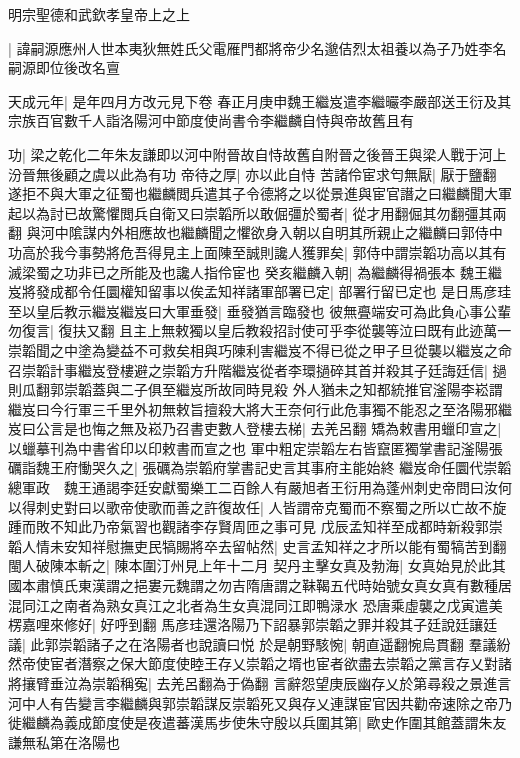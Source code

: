 明宗聖德和武欽孝皇帝上之上

|{
	諱嗣源應州人世本夷狄無姓氏父電雁門都將帝少名邈佶烈太祖養以為子乃姓李名嗣源即位後改名亶}


天成元年|{
	是年四月方改元見下卷}
春正月庚申魏王繼岌遣李繼曮李嚴部送王衍及其宗族百官數千人詣洛陽河中節度使尚書令李繼麟自恃與帝故舊且有

功|{
	梁之乾化二年朱友謙即以河中附晉故自恃故舊自附晉之後晉王與梁人戰于河上汾晉無後顧之虞以此為有功}
帝待之厚|{
	亦以此自恃}
苦諸伶宦求匄無厭|{
	厭于鹽翻}
遂拒不與大軍之征蜀也繼麟閲兵遣其子令德將之以從景進與宦官譖之曰繼麟聞大軍起以為討已故驚懼閲兵自衛又曰崇韜所以敢倔彊於蜀者|{
	從才用翻倔其勿翻彊其兩翻}
與河中隂謀内外相應故也繼麟聞之懼欲身入朝以自明其所親止之繼麟曰郭侍中功高於我今事勢將危吾得見主上面陳至誠則讒人獲罪矣|{
	郭侍中謂崇韜功高以其有滅梁蜀之功非已之所能及也讒人指伶宦也}
癸亥繼麟入朝|{
	為繼麟得禍張本}
魏王繼岌將發成都令任圜權知留事以俟孟知祥諸軍部署已定|{
	部署行留已定也}
是日馬彦珪至以皇后教示繼岌繼岌曰大軍垂發|{
	垂發猶言臨發也}
彼無亹端安可為此負心事公輩勿復言|{
	復扶又翻}
且主上無敕獨以皇后教殺招討使可乎李從襲等泣曰既有此迹萬一崇韜聞之中塗為變益不可救矣相與巧陳利害繼岌不得已從之甲子旦從襲以繼岌之命召崇韜計事繼岌登樓避之崇韜方升階繼岌從者李環撾碎其首并殺其子廷誨廷信|{
	撾則瓜翻郭崇韜蓋與二子俱至繼岌所故同時見殺}
外人猶未之知都統推官滏陽李崧謂繼岌曰今行軍三千里外初無敕旨擅殺大將大王奈何行此危事獨不能忍之至洛陽邪繼岌曰公言是也悔之無及崧乃召書吏數人登樓去梯|{
	去羌呂翻}
矯為敕書用蠟印宣之|{
	以蠟摹刊為中書省印以印敕書而宣之也}
軍中粗定崇韜左右皆竄匿獨掌書記滏陽張礪詣魏王府慟哭久之|{
	張礪為崇韜府掌書記史言其事府主能始終}
繼岌命任圜代崇韜總軍政　魏王通謁李廷安獻蜀樂工二百餘人有嚴旭者王衍用為蓬州刺史帝問曰汝何以得刺史對曰以歌帝使歌而善之許復故任|{
	人皆謂帝克蜀而不察蜀之所以亡故不旋踵而敗不知此乃帝氣習也觀諸李存賢周匝之事可見}
戊辰孟知祥至成都時新殺郭崇韜人情未安知祥慰撫吏民犒賜將卒去留帖然|{
	史言孟知祥之才所以能有蜀犒苦到翻}
閩人破陳本斬之|{
	陳本圍汀州見上年十二月}
契丹主擊女真及勃海|{
	女真始見於此其國本肅慎氏東漢謂之挹婁元魏謂之勿吉隋唐謂之靺鞨五代時始號女真女真有數種居混同江之南者為熟女真江之北者為生女真混同江即鴨渌水}
恐唐乘虛襲之戊寅遣美楞嘉哩來修好|{
	好呼到翻}
馬彦珪還洛陽乃下詔暴郭崇韜之罪并殺其子廷說廷讓廷議|{
	此郭崇韜諸子之在洛陽者也說讀曰悦}
於是朝野駭惋|{
	朝直遥翻惋烏貫翻}
羣議紛然帝使宦者潛察之保大節度使睦王存乂崇韜之壻也宦者欲盡去崇韜之黨言存乂對諸將攘臂垂泣為崇韜稱寃|{
	去羌呂翻為于偽翻}
言辭怨望庚辰幽存乂於第尋殺之景進言河中人有告變言李繼麟與郭崇韜謀反崇韜死又與存乂連謀宦官因共勸帝速除之帝乃徙繼麟為義成節度使是夜遣蕃漢馬步使朱守殷以兵圍其第|{
	歐史作圍其館蓋謂朱友謙無私第在洛陽也}
